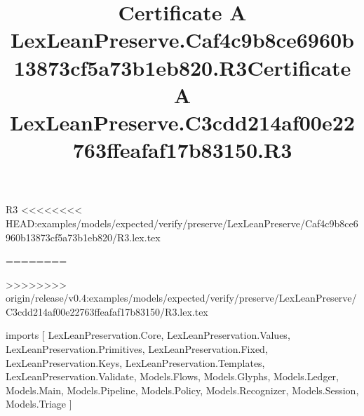\begin{lexlean}{R3}
<<<<<<<< HEAD:examples/models/expected/verify/preserve/LexLeanPreserve/Caf4c9b8ce6960b13873cf5a73b1eb820/R3.lex.tex
\title{Certificate A LexLeanPreserve.Caf4c9b8ce6960b13873cf5a73b1eb820.R3}
========
\title{Certificate A LexLeanPreserve.C3cdd214af00e22763ffeafaf17b83150.R3}
>>>>>>>> origin/release/v0.4:examples/models/expected/verify/preserve/LexLeanPreserve/C3cdd214af00e22763ffeafaf17b83150/R3.lex.tex
\begin{coremodule}
imports [
  LexLeanPreservation.Core,
  LexLeanPreservation.Values,
  LexLeanPreservation.Primitives,
  LexLeanPreservation.Fixed,
  LexLeanPreservation.Keys,
  LexLeanPreservation.Templates,
  LexLeanPreservation.Validate,
  Models.Flows,
  Models.Glyphs,
  Models.Ledger,
  Models.Main,
  Models.Pipeline,
  Models.Policy,
  Models.Recognizer,
  Models.Session,
  Models.Triage
]


\end{coremodule}
\end{lexlean}
